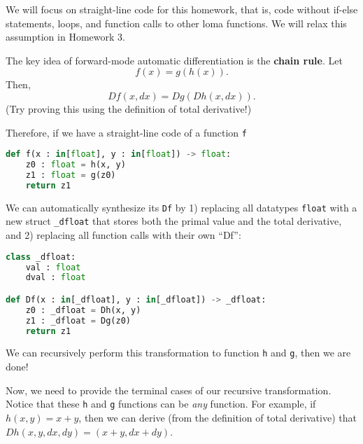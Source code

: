 We will focus on straight-line code for this homework, that is, code without if-else statements, loops, and function calls to other loma functions. We will relax this assumption in Homework 3. 

The key idea of forward-mode automatic differentiation is the \textbf{chain rule}. Let
\begin{equation}
	f(x) = g(h(x)).
\end{equation}
Then,
\begin{equation}
	Df(x, dx) = Dg(Dh(x, dx)).
\end{equation}
(Try proving this using the definition of total derivative!)

Therefore, if we have a straight-line code of a function \lstinline{f}
\begin{lstlisting}[language=Python]
def f(x : in[float], y : in[float]) -> float:
	z0 : float = h(x, y)
	z1 : float = g(z0)
	return z1
\end{lstlisting}
We can automatically synthesize its \lstinline{Df} by 1) replacing all datatypes \lstinline{float} with a new struct \lstinline{_dfloat} that stores both the primal value and the total derivative, and 2) replacing all function calls with their own ``Df'':
\begin{lstlisting}[language=Python]
class _dfloat:
	val : float
	dval : float

def Df(x : in[_dfloat], y : in[_dfloat]) -> _dfloat:
	z0 : _dfloat = Dh(x, y)
	z1 : _dfloat = Dg(z0)
	return z1
\end{lstlisting}
We can recursively perform this transformation to function \lstinline{h} and \lstinline{g}, then we are done!

Now, we need to provide the terminal cases of our recursive transformation. Notice that these \lstinline{h} and \lstinline{g} functions can be \emph{any} function. For example, if $h(x, y) = x + y$, then we can derive (from the definition of total derivative) that $Dh(x, y, dx, dy) = (x + y, dx + dy)$. 

